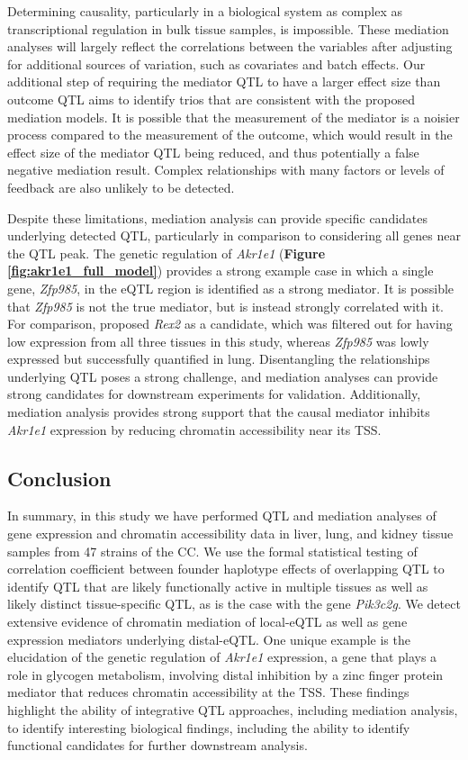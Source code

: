 \documentclass[9pt,twocolumn,twoside]{gsajnl}
\begin{document}
Determining causality, particularly in a biological system as complex as transcriptional regulation in bulk tissue samples, is impossible. These mediation analyses will largely reflect the correlations between the variables after adjusting for additional sources of variation, such as covariates and batch effects. Our additional step of requiring the mediator QTL to have a larger effect size than outcome QTL aims to identify trios that are consistent with the proposed mediation models. It is possible that the measurement of the mediator is a noisier process compared to the measurement of the outcome, which would result in the effect size of the mediator QTL being reduced, and thus potentially a false negative mediation result. Complex relationships with many factors or levels of feedback are also unlikely to be detected.

Despite these limitations, mediation analysis can provide specific candidates underlying detected QTL, particularly in comparison to considering all genes near the QTL peak. The genetic regulation of \textit{Akr1e1} (\textbf{Figure \ref{fig:akr1e1_full_model}}) provides a strong example case in which a single gene, \textit{Zfp985}, in the eQTL region is identified as a strong mediator. It is possible that \textit{Zfp985} is not the true mediator, but is instead strongly correlated with it. For comparison, \cite{HamiltonWilliams2013} proposed \textit{Rex2} as a candidate, which was filtered out for having low expression from all three tissues in this study, whereas \textit{Zfp985} was lowly expressed but successfully quantified in lung. Disentangling the relationships underlying QTL poses a strong challenge, and mediation analyses can provide strong candidates for downstream experiments for validation. Additionally, mediation analysis provides strong support that the causal mediator inhibits \textit{Akr1e1} expression by reducing chromatin accessibility near its TSS.

\subsection{Conclusion}

In summary, in this study we have performed QTL and mediation analyses of gene expression and chromatin accessibility data in liver, lung, and kidney tissue samples from 47 strains of the CC. We use the formal statistical testing of correlation coefficient between founder haplotype effects of overlapping QTL to identify QTL that are likely functionally active in multiple tissues as well as likely distinct tissue-specific QTL, as is the case with the gene \textit{Pik3c2g}. We detect extensive evidence of chromatin mediation of local-eQTL as well as gene expression mediators underlying distal-eQTL. One unique example is the elucidation of the genetic regulation of \textit{Akr1e1} expression, a gene that plays a role in glycogen metabolism, involving distal inhibition by a zinc finger protein mediator that reduces chromatin accessibility at the TSS. These findings highlight the ability of integrative QTL approaches, including mediation analysis, to identify interesting biological findings, including the ability to identify functional candidates for further downstream analysis.
\end{document}
